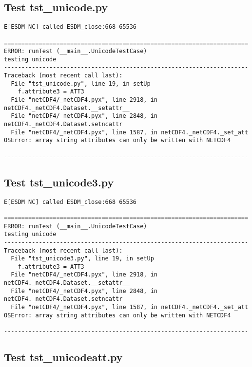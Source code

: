 \subsection{Test tst\_unicode.py}

\begin{verbatim}
E[ESDM NC] called ESDM_close:668 65536

======================================================================
ERROR: runTest (__main__.UnicodeTestCase)
testing unicode
----------------------------------------------------------------------
Traceback (most recent call last):
  File "tst_unicode.py", line 19, in setUp
    f.attribute3 = ATT3
  File "netCDF4/_netCDF4.pyx", line 2918, in netCDF4._netCDF4.Dataset.__setattr__
  File "netCDF4/_netCDF4.pyx", line 2848, in netCDF4._netCDF4.Dataset.setncattr
  File "netCDF4/_netCDF4.pyx", line 1587, in netCDF4._netCDF4._set_att
OSError: array string attributes can only be written with NETCDF4

----------------------------------------------------------------------
\end{verbatim}

\subsection{Test tst\_unicode3.py}

\begin{verbatim}
E[ESDM NC] called ESDM_close:668 65536

======================================================================
ERROR: runTest (__main__.UnicodeTestCase)
testing unicode
----------------------------------------------------------------------
Traceback (most recent call last):
  File "tst_unicode3.py", line 19, in setUp
    f.attribute3 = ATT3
  File "netCDF4/_netCDF4.pyx", line 2918, in netCDF4._netCDF4.Dataset.__setattr__
  File "netCDF4/_netCDF4.pyx", line 2848, in netCDF4._netCDF4.Dataset.setncattr
  File "netCDF4/_netCDF4.pyx", line 1587, in netCDF4._netCDF4._set_att
OSError: array string attributes can only be written with NETCDF4

----------------------------------------------------------------------
\end{verbatim}

\subsection{Test tst\_unicodeatt.py}

